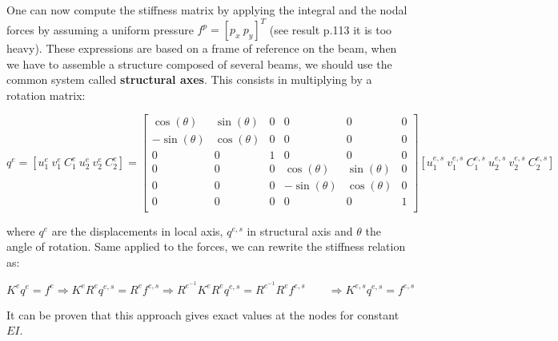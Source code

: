 	One can now compute the stiffness matrix by applying the integral and the nodal forces by assuming a uniform pressure $f^p = [p_x \ p_y]^T$ (see result p.113 it is too heavy). These expressions are based on a frame of reference on the beam, when we have to assemble a structure composed of several beams, we should use the common system called \textbf{structural axes}. This consists in multiplying by a rotation matrix: 
	
	\begin{equation}
	q^e = [u_1^e \ v_1^e \ C_1^e \ u_2^e \ v_2^e \ C_2^e] = \left[ 
	\begin{array}{cccccc}
	\cos (\theta) & \sin (\theta) & 0 & 0 &0&0\\
	-\sin (\theta) & \cos (\theta) & 0 & 0 &0&0\\
	0 & 0 & 1 & 0 & 0 & 0\\	
	0 & 0 & 0 & \cos (\theta) & \sin (\theta) & 0\\	
	0 & 0 & 0 & -\sin (\theta) & \cos (\theta) & 0\\	
	0 & 0 & 0 & 0 & 0 & 1\\		
	\end{array}
	\right]
	 [u_1^{e,s} \ v_1^{e,s} \ C_1^{e,s} \ u_2^{e,s} \ v_2^{e,s} \ C_2^{e,s}] 
	\end{equation}
	
	where $q^e$ are the displacements in local axis, $q^{e,s}$ in structural axis and $\theta$ the angle of rotation. Same applied to the forces, we can rewrite the stiffness relation as:
	
	\begin{equation}
	K^e q^e = f^e \Rightarrow K^e R^e q^{e,s} = R^e f^{e,s}\Rightarrow R^{e^{-1}} K^e R^e q^{e,s} = R^{e^{-1}}R^e f^{e,s}\qquad \Rightarrow K^{e,s} q^{e,s} = f^{e,s}
	\end{equation}
	
	It can be proven that this approach gives exact values at the nodes for constant $EI$.